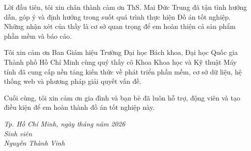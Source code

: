 \documentclass[12pt,a4paper,oneside]{book}
\begin{document}
\begin{acknowledgments}
  Lời đầu tiên, tôi xin chân thành cảm ơn ThS. Mai Đức Trung đã tận tình hướng dẫn, góp ý và định hướng trong suốt quá trình thực hiện Đồ án tốt nghiệp. Những nhận xét của thầy là cơ sở quan trọng để em hoàn thiện cả sản phẩm phần mềm và báo cáo.

  Tôi xin cảm ơn Ban Giám hiệu Trường Đại học Bách khoa, Đại học Quốc gia Thành phố Hồ Chí Minh cùng quý thầy cô Khoa Khoa học và Kỹ thuật Máy tính đã cung cấp nền tảng kiến thức về phát triển phần mềm, cơ sở dữ liệu, hệ thống web và phương pháp giải quyết vấn đề.

  Cuối cùng, tôi xin cảm ơn gia đình và bạn bè đã luôn hỗ trợ, động viên và tạo điều kiện để em hoàn thành đồ án tốt nghiệp này.

  \begin{flushright}
    \textit{Tp. Hồ Chí Minh, ngày \underline{\hspace{1cm}} tháng \underline{\hspace{1cm}} năm 2026\\}
    \textit{Sinh viên\\}
    \textit{Nguyễn Thành Vinh}
  \end{flushright}
\end{acknowledgments}
\end{document}
